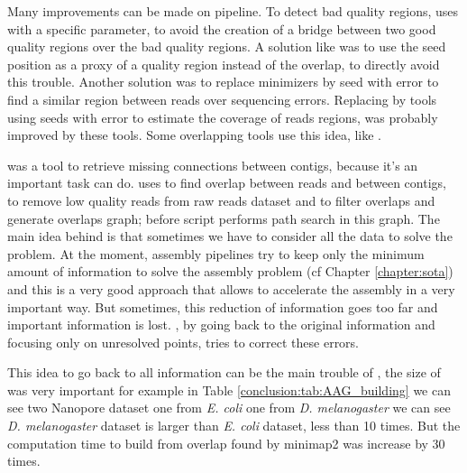 \documentclass[main.tex]{subfiles}
\begin{document}
Many improvements can be made on \yacrd pipeline. To detect bad quality regions, \yacrd uses \minimap with a specific parameter, to avoid the creation of a bridge between two good quality regions over the bad quality regions. A solution like \miniscrub was to use the seed position as a proxy of a quality region instead of the overlap, to directly avoid this trouble. Another solution was to replace minimizers by seed with error to find a similar region between reads over sequencing errors. Replacing \minimap by tools using seeds with error to estimate the coverage of reads regions, was probably improved by these tools. Some overlapping tools use this idea, like \cite{GroupK}. 

\knot was a tool to retrieve missing connections between contigs, because it's an important task \knot can do. \knot uses \minimap to find overlap between reads and between contigs, \yacrd to remove low quality reads from raw reads dataset and \fpa to filter overlaps and generate overlaps graph; before \knot script performs path search in this graph. The main idea behind \knot is that sometimes we have to consider all the data to solve the problem. At the moment, assembly pipelines try to keep only the minimum amount of information to solve the assembly problem (cf Chapter \ref{chapter:sota}) and this is a very good approach that allows to accelerate the assembly in a very important way. But sometimes, this reduction of information goes too far and important information is lost. \knot, by going back to the original information and focusing only on unresolved points, tries to correct these errors.

\bigskip

This idea to go back to all information can be the main trouble of \knot, the size of \knot \OLC was very important for example in Table \ref{conclusion:tab:AAG_building} we can see two Nanopore dataset one from \textit{E. coli} one from \textit{D. melanogaster} we can see \textit{D. melanogaster} dataset is larger than \textit{E. coli} dataset, less than 10 times. But the computation time to build \knot \OLC from overlap found by minimap2 was increase by 30 times.
\end{document}
